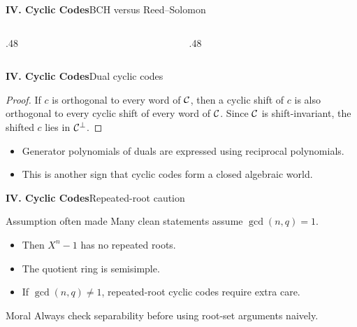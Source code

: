 \begin{frame}{\textbf{IV. Cyclic Codes}}{BCH versus Reed--Solomon}
\small
\begin{columns}[T,onlytextwidth]
  \begin{column}{.48\textwidth}
  \end{column}
  \begin{column}{.48\textwidth}
  \end{column}
\end{columns}
\end{frame}

\begin{frame}{\textbf{IV. Cyclic Codes}}{Dual cyclic codes}
\small
{}
\begin{proof}
If $c$ is orthogonal to every word of $\mathcal{C}$, then a cyclic shift of $c$ is also orthogonal to every cyclic shift of every word of $\mathcal{C}$. Since $\mathcal{C}$ is shift-invariant, the shifted $c$ lies in $\mathcal{C}^\perp$.
\end{proof}
\begin{itemize}
  \item Generator polynomials of duals are expressed using reciprocal polynomials.
  \item This is another sign that cyclic codes form a closed algebraic world.
\end{itemize}
\end{frame}

\begin{frame}{\textbf{IV. Cyclic Codes}}{Repeated-root caution}
\small
\begin{block}{Assumption often made}
Many clean statements assume $\gcd(n,q)=1$.
\end{block}
\begin{itemize}
  \item Then $X^n-1$ has no repeated roots.
  \item The quotient ring is semisimple.
  \item If $\gcd(n,q)\ne1$, repeated-root cyclic codes require extra care.
\end{itemize}
\begin{block}{Moral}
Always check separability before using root-set arguments naively.
\end{block}
\end{frame}

